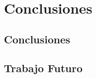 \chapter{Conclusiones}
\label{chap:conclusion}


\section{Conclusiones}
\label{conclusion:webb}


\section{Trabajo Futuro}
\label{conclusion:futuro}

